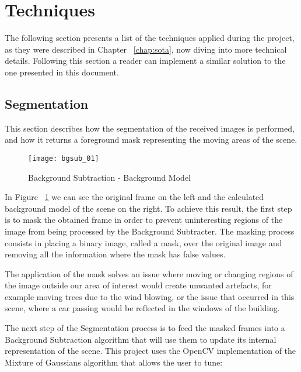 \section{Techniques}

The following section presents a list of the techniques applied during the project, as they were described in Chapter ~\ref{chap:sota}, now diving into more technical details. Following this section a reader can implement a similar solution to the one presented in this document.

\subsection{Segmentation}
\label{sub:segmentation}

This section describes how the segmentation of the received images is performed, and how it returns a foreground mask representing the moving areas of the scene. 

\begin{figure}[h]
  \begin{center}
    \leavevmode
    \texttt{[image: bgsub\_01]}
    \caption{Background Subtraction - Background Model}
    \label{fig:bgsub_01}
  \end{center}
\end{figure}

In Figure ~\ref{fig:bgsub_01} we can see the original frame on the left and the calculated background model of the scene on the right. To achieve this result, the first step is to mask the obtained frame in order to prevent uninteresting regions of the image from being processed by the Background Subtracter. The masking process consists in placing a binary image, called a mask, over the original image and removing all the information where the mask has false values. 

The application of the mask solves an issue where moving or changing regions of the image outside our area of interest would create unwanted artefacts, for example moving trees due to the wind blowing, or the issue that occurred in this scene, where a car passing would be reflected in the windows of the building.

The next step of the Segmentation process is to feed the masked frames into a Background Subtraction algorithm that will use them to update its internal representation of the scene. This project uses the OpenCV implementation of the Mixture of Gaussians algorithm that allows the user to tune:


